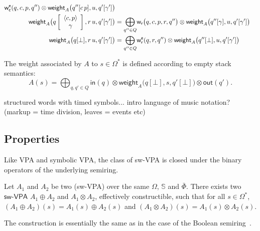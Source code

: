 \documentclass[runningheads]{llncs}
\def\<#1>{\langle #1 \rangle}
\newcommand{\config}[2]{\ensuremath{#1}[{#2}]}
\newcommand{\configup}[2]{\ensuremath{#1}\left[\begin{array}{c} #2 \end{array}\right]}
\def\stacksep{\cdot}
\def\stackup{\\}
\newcommand{\Semiring}{\mathbb{S}}
\def\SWVPA{\textsf{sw-VPA}\xspace}
\def\weight{\mathsf{weight}}
\def\wei{\mathsf{w}}
\newcommand{\call}[1]{\ensuremath #1} %
\newcommand{\return}[1]{\ensuremath #1} %
\def\Omegac{{\Omega_\mathsf{c}}}
\def\weir{{\wei_\mathsf{r}}}
\def\weiec{{\wei^\mathsf{e}_\mathsf{c}}}
\def\weier{{\wei^\mathsf{e}_\mathsf{r}}}
\begin{document}
\begin{align}
{{\begin{array}{c}
                          \end{array}}}
  \weiec(q, {\call{c}}, p, q'') 
  \otimes \weight_A\bigl(\config{q''}{{\call{c}}\, p}, u, 
                         \config{q'}{\gamma'}\bigr)\nonumber\\
%
\weight_A\bigl(\configup{q}{\<{\call{c}}, p>\stackup \gamma}, {\return{r}}\, u, 
               \config{q'}{\gamma'}\bigr) & =  
 {\displaystyle\bigoplus_{q'' \in Q}} 
  \weir\bigl(q, {\call{c}}, p, {\return{r}}, q''\bigr) 
  \otimes \weight_A\bigl(\config{q''}{\gamma}, u, 
                         \config{q'}{\gamma'}\bigr)\nonumber\\
%
\weight_A\bigl(\config{q}{\bot}, {\return{r}}\, u, 
               \config{q'}{\gamma'}\bigr) & =  
 {\displaystyle\bigoplus_{q'' \in Q}} \weier(q, {\return{r}}, q'') 
  \otimes \weight_A\bigl(\config{q''}{\bot}, u, 
                         \config{q'}{\gamma'}\bigr)\nonumber
\end{align}
%

\noindent
The weight associated by $A$ to $s \in \Omega^*$
is defined according to empty stack semantics: 
%
\begin{equation}
A(s)  = 
{\displaystyle\bigoplus_{q, q' \in Q}} \textstyle
\mathsf{in}(q) \mathop{\otimes} 
\weight_A\bigl(\config{q}{\bot}, s, \config{q'}{\bot}\bigr) 
\mathop{\otimes} \mathsf{out}(q').
\label{eq:weightA}
\end{equation}

\begin{example}
structured words with timed symbols...
intro language of music notation? (markup = time division, leaves = events etc)
\end{example}


\subsection{Properties}
Like VPA and symbolic VPA, 
the class of \SWVPA is closed under the binary operators of the underlying semiring.
%
\begin{proposition}\label{prop:SWVPA-product}
Let $A_1$ and $A_2$ be two (\SWVPA)
over the same $\Omega$, $\Semiring$ and $\bar\Phi$.
There exists two $\SWVPA$ $A_1 \oplus A_2$ and $A_1 \otimes A_2$, 
effectively constructible, 
such that for all $s \in \Omega^*$, 
$(A_1 \oplus A_2)(s) = A_1(s) \oplus A_2(s)$ and 
$(A_1 \otimes A_2)(s) = A_1(s) \otimes A_2(s)$.
\end{proposition}
The construction is essentially the same 
as in the case of the Boolean semiring~\cite{dAntonyAlur14SVPDA}.
\end{document}
